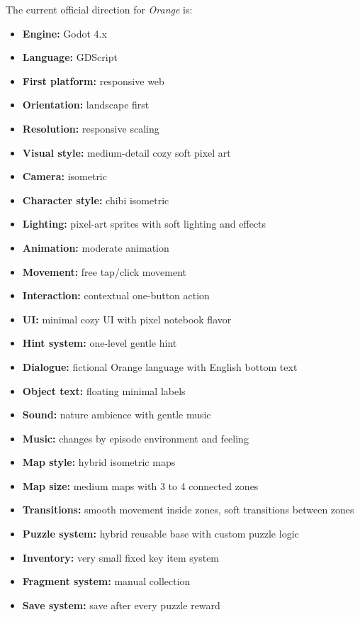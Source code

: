 \documentclass[12pt]{article}
\begin{document}
The current official direction for \textit{Orange} is:

\begin{itemize}[leftmargin=*]
    \item \textbf{Engine:} Godot 4.x
    \item \textbf{Language:} GDScript
    \item \textbf{First platform:} responsive web
    \item \textbf{Orientation:} landscape first
    \item \textbf{Resolution:} responsive scaling
    \item \textbf{Visual style:} medium-detail cozy soft pixel art
    \item \textbf{Camera:} isometric
    \item \textbf{Character style:} chibi isometric
    \item \textbf{Lighting:} pixel-art sprites with soft lighting and effects
    \item \textbf{Animation:} moderate animation
    \item \textbf{Movement:} free tap/click movement
    \item \textbf{Interaction:} contextual one-button action
    \item \textbf{UI:} minimal cozy UI with pixel notebook flavor
    \item \textbf{Hint system:} one-level gentle hint
    \item \textbf{Dialogue:} fictional Orange language with English bottom text
    \item \textbf{Object text:} floating minimal labels
    \item \textbf{Sound:} nature ambience with gentle music
    \item \textbf{Music:} changes by episode environment and feeling
    \item \textbf{Map style:} hybrid isometric maps
    \item \textbf{Map size:} medium maps with 3 to 4 connected zones
    \item \textbf{Transitions:} smooth movement inside zones, soft transitions between zones
    \item \textbf{Puzzle system:} hybrid reusable base with custom puzzle logic
    \item \textbf{Inventory:} very small fixed key item system
    \item \textbf{Fragment system:} manual collection
    \item \textbf{Save system:} save after every puzzle reward

\end{itemize}
\end{document}
